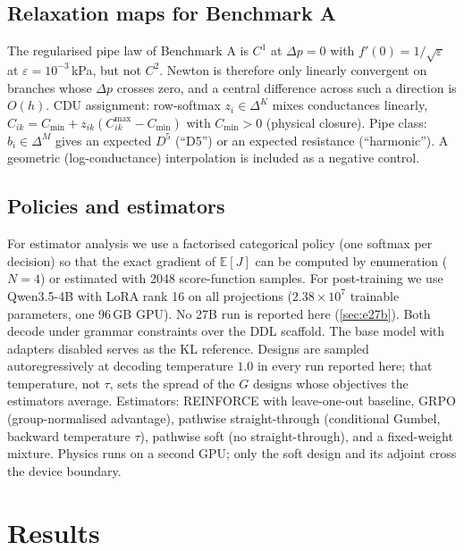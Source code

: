 \documentclass[journal]{IEEEtran}
\newcommand{\ddl}{DDL}
\newcommand{\Jobj}{J}
\newcommand{\E}{\mathbb{E}}
\begin{document}
\subsection{Relaxation maps for Benchmark A}
The regularised pipe law of Benchmark A is $C^1$ at $\Delta p=0$ with
$f'(0)=1/\sqrt{\varepsilon}$ at $\varepsilon=10^{-3}$\,kPa, but not $C^2$.  Newton
is therefore only linearly convergent on branches whose $\Delta p$ crosses zero,
and a central difference across such a direction is $O(h)$.
CDU assignment: row-softmax $z_i\in\Delta^K$ mixes conductances linearly,
$C_{ik}=C_{\min}+z_{ik}(C^{\max}_{ik}-C_{\min})$ with $C_{\min}>0$ (physical
closure).  Pipe class: $b_i\in\Delta^M$ gives an expected $D^5$ (``D5'') or an
expected resistance (``harmonic'').  A geometric (log-conductance) interpolation
is included as a negative control.

\subsection{Policies and estimators}
For estimator analysis we use a factorised categorical policy (one softmax per
decision) so that the exact gradient of $\E[\Jobj]$ can be computed by
enumeration ($N{=}4$) or estimated with 2048 score-function samples.  For post-training we use Qwen3.5-4B with LoRA rank 16 on all projections
($2.38\times10^{7}$ trainable parameters, one 96\,GB GPU).  No 27B run is reported here (\cref{sec:e27b}).  Both decode under
grammar constraints over the \ddl{} scaffold.  The base model with adapters disabled
serves as the KL reference.  Designs are sampled autoregressively at decoding temperature $1.0$ in every
run reported here; that temperature, not $\tau$, sets the spread of the $G$
designs whose objectives the estimators average.  Estimators: REINFORCE with
leave-one-out baseline, GRPO (group-normalised advantage), pathwise
straight-through (conditional Gumbel, backward temperature $\tau$), pathwise soft
(no straight-through), and a fixed-weight mixture.  Physics runs on a second
GPU; only the soft design and its adjoint cross the device boundary.

\FloatBarrier
\section{Results}
\label{sec:experiments}
\end{document}
